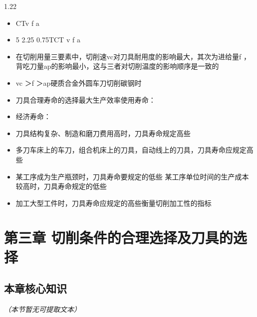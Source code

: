 \documentclass[12pt,a4paper]{article}
\begin{document}
\begin{spacing}{1.22}
\begin{itemize}[leftmargin=2.2em,label=--]
  \item CTv f a
  \item 5 2.25 0.75TCT v f a
  \item 在切削用量三要素中，切削速vc对刀具耐用度的影响最大，其次为进给量f ，背吃刀量ap的影响最小，这与三者对切削温度的影响顺序是一致的
  \item vc ＞f ＞ap硬质合金外圆车刀切削碳钢时
  \item 刀具合理寿命的选择最大生产效率使用寿命：
  \item 经济寿命：
  \item 刀具结构复杂、制造和磨刀费用高时，刀具寿命规定高些
  \item 多刀车床上的车刀，组合机床上的刀具，自动线上的刀具，刀具寿命应规定高些
  \item 某工序成为生产瓶颈时，刀具寿命要规定的低些 某工序单位时间的生产成本较高时，刀具寿命规定的低些
  \item 加工大型工件时，刀具寿命应规定的高些衡量切削加工性的指标
\end{itemize}

\section{第三章 切削条件的合理选择及刀具的选择}
\subsection{本章核心知识}
\textit{（本节暂无可提取文本）}


\end{spacing}
\end{document}
